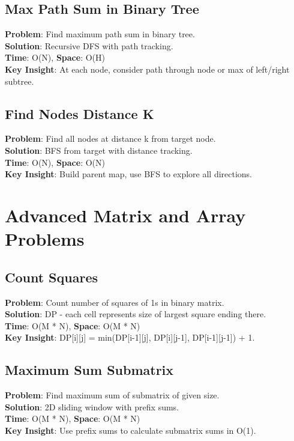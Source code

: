 \documentclass{report}
\begin{document}
\subsection{Max Path Sum in Binary Tree}
\textbf{Problem}: Find maximum path sum in binary tree.\\
\textbf{Solution}: Recursive DFS with path tracking.\\
\textbf{Time}: O(N), \textbf{Space}: O(H)\\
\textbf{Key Insight}: At each node, consider path through node or max of left/right subtree.

\subsection{Find Nodes Distance K}
\textbf{Problem}: Find all nodes at distance k from target node.\\
\textbf{Solution}: BFS from target with distance tracking.\\
\textbf{Time}: O(N), \textbf{Space}: O(N)\\
\textbf{Key Insight}: Build parent map, use BFS to explore all directions.

\section{Advanced Matrix and Array Problems}

\subsection{Count Squares}
\textbf{Problem}: Count number of squares of 1s in binary matrix.\\
\textbf{Solution}: DP - each cell represents size of largest square ending there.\\
\textbf{Time}: O(M * N), \textbf{Space}: O(M * N)\\
\textbf{Key Insight}: DP[i][j] = min(DP[i-1][j], DP[i][j-1], DP[i-1][j-1]) + 1.

\subsection{Maximum Sum Submatrix}
\textbf{Problem}: Find maximum sum of submatrix of given size.\\
\textbf{Solution}: 2D sliding window with prefix sums.\\
\textbf{Time}: O(M * N), \textbf{Space}: O(M * N)\\
\textbf{Key Insight}: Use prefix sums to calculate submatrix sums in O(1).
\end{document}

